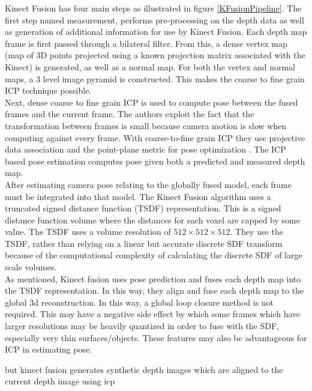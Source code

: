 Kinect Fusion has four main steps as illustrated in figure \ref{KFusionPipeline}. The first step named measurement, performs pre-processing on the depth data as well as generation of additional information for use by Kinect Fusion. Each depth map frame is first passed through a bilateral filter. From this, a dense vertex map (map of 3D points projected using a known projection matrix associated with the Kinect) is generated, as well as a normal map. For both the vertex and normal maps, a 3 level image pyramid is constructed. This makes the coarse to fine grain ICP technique possible. \\

Next, dense coarse to fine grain ICP is used to compute pose between the fused frames and the current frame. The authors exploit the fact that the transformation between frames is small because camera motion is slow when computing against every frame. With coarse-to-fine grain ICP they use projective data association \cite{Blais95Registering} and the point-plane metric for pose optimization \cite{Rusinkiewicz02Real}. The ICP based pose estimation computes pose given both a predicted and measured depth map. \\

After estimating camera pose relating to the globally fused model, each frame must be integrated into that model. The Kinect Fusion algorithm uses a truncated signed distance function (TSDF) representation. This is a signed distance function volume where the distances for each voxel are capped by some value. The TSDF uses a volume resolution of $512\times 512\times 512$. They use the TSDF, rather than relying on a linear but accurate discrete SDF transform \cite{Rasch09Remarks} because of the computational complexity of calculating the discrete SDF of large scale volumes. \\

As mentioned, Kinect fusion uses pose prediction and fuses each depth map into the TSDF representation. In this way, they align and fuse each depth map to the global 3d reconstruction. In this way, a global loop closure method is not required. This may have a negative side effect by which some frames which have larger resolutions may be heavily quantized in order to fuse with the SDF, especially very thin surfaces/objects. These features may also be advantageous for ICP in estimating pose. 


but kinect fusion generates synthetic depth images which are aligned to the current depth image using icp

